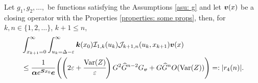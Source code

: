 \begin{cor}\label{cor: lh and rh}
	Let \(g_1, g_2, \dots,\) be functions satisfying the Assumptions \ref{asu: g} and let \(\boldsymbol v(x)\) be a closing operator with the Properties \ref{properties: some props}, then, for \(k,n \in \{1,2,\dots\}\), \(k+1\leq n\),
	\begin{align}
		&\int_{x_{k+1}=0}^\infty \int_{u_k=\Delta-\varepsilon}^\infty \boldsymbol k(x_0)\mathcal I_{1,k}(u_k) \mathcal J_{k+1,n}(u_k,x_{k+1})\boldsymbol v(x) \nonumber
            	\\&\leq \cfrac{1}{\boldsymbol \alpha e^{\boldsymbol{S}x_0}\boldsymbol e}\left(\left(2\varepsilon + \cfrac{\mathrm{Var}(Z)}{\varepsilon}\right) G^2 \widehat G^{n-2} G_{\boldsymbol v} + G\widehat G^{n}O(\mathrm{Var}(Z))\right)  =: |r_4(n)|. \label{eqn: the result tail}
	\end{align}
\end{cor}
